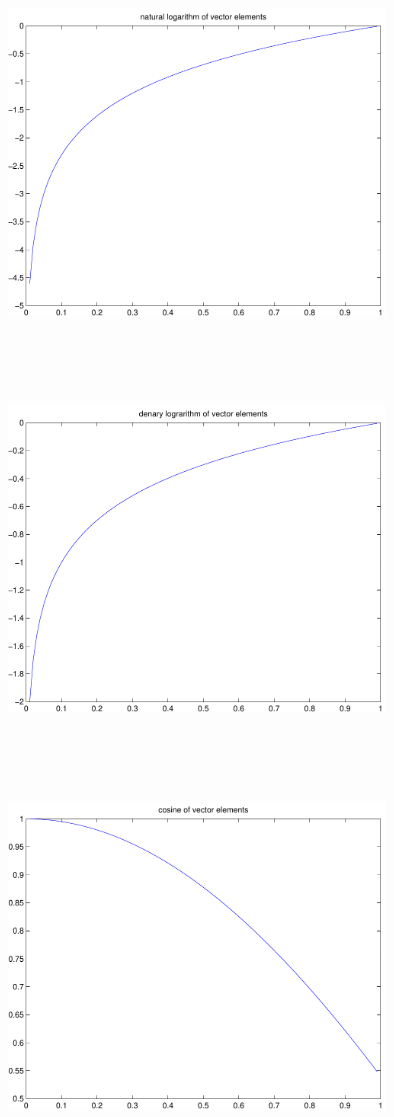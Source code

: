 \documentclass[9pt]{article}
\theoremstyle{plain}
\theoremstyle{definition}
\theoremstyle{remark}
\numberwithin{equation}{section}
\begin{document}
\includegraphics[width=10.0cm,height=10.0cm]{klVSLLn.pdf}

\includegraphics[width=10.0cm,height=10.0cm]{klVSLLog10.pdf}

\includegraphics[width=10.0cm,height=10.0cm]{klVSLCos.pdf}
\end{document}
